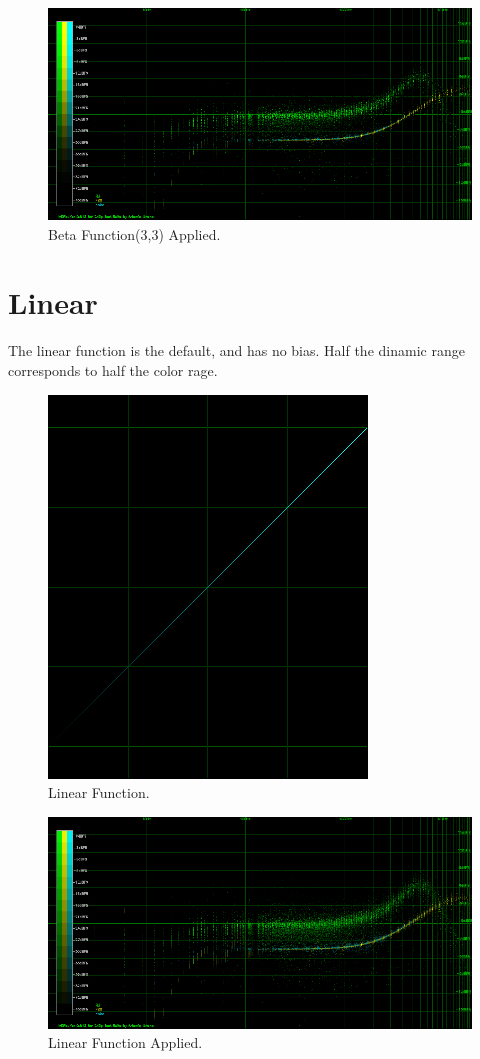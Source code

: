 \documentclass[10pt,a4paper]{report}
\begin{document}
\begin{appendices}
\begin{figure}[H]
	\centering
	\includegraphics[width=1\linewidth]{images/colorfilter/BetaFunctionPlot_2_Data.png}
	\caption[Beta Function(3,3)]{Beta Function(3,3) Applied.}
	\label{fig:betafunctionplot2data}
\end{figure}

\section{Linear} 

The linear function is the default, and has no bias. Half the dinamic range corresponds to half the color rage.

\begin{figure}[H]
	\centering
	\includegraphics[width=0.4\linewidth]{images/colorfilter/BetaFunctionPlot_3.png}
	\caption[Linear]{Linear Function.}
	\label{fig:betafunctionplot3}
\end{figure}

\begin{figure}[H]
	\centering
	\includegraphics[width=1\linewidth]{images/colorfilter/BetaFunctionPlot_3_Data.png}
	\caption[Linear Applied]{Linear Function Applied.}
	\label{fig:betafunctionplot3data}
\end{figure}


\end{appendices}
\end{document}
